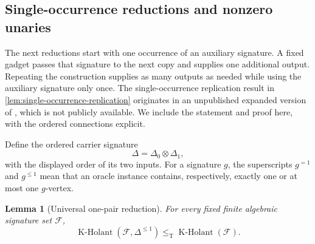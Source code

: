 \documentclass[11pt,letterpaper,onecolumn]{article}
\theoremstyle{plain}
\newtheorem{lemma}[lemma]{Lemma}
\theoremstyle{definition}
\theoremstyle{remark}
\newcommand{\cF}{\mathcal F}
\newcommand{\KHolant}{\operatorname{K\text{-}Holant}}
\newcommand{\DeltaZero}{\Delta_0}
\newcommand{\DeltaOne}{\Delta_1}
\newcommand{\leT}{\leq_{\mathrm T}}
\begin{document}
\subsection{Single-occurrence reductions and nonzero unaries}
\label{subsec:single-occurrence-carriers}

The next reductions start with one occurrence of an auxiliary signature.
A fixed gadget passes that signature to the next copy and supplies one
additional output. Repeating the construction supplies as many outputs
as needed while using the auxiliary signature only once.
The single-occurrence replication result in
\cref{lem:single-occurrence-replication} originates in an unpublished
expanded version of \cite{MengWangXiaZheng2025}, which is not publicly
available. We include the statement and proof here, with the ordered
connections explicit.

Define the ordered carrier signature
\[
  \Delta=\DeltaZero\otimes\DeltaOne,
\]
with the displayed order of its two inputs.  For a signature \(g\), the
superscripts \(g^{=1}\) and \(g^{\leq1}\) mean that an oracle instance contains,
respectively, exactly one or at most one \(g\)-vertex.  

\begin{lemma}[Universal one-pair reduction]
\label{lem:universal-directed-pair}
For every fixed finite algebraic signature set \(\cF\),
\[
  \KHolant(\cF,\Delta^{\leq1})
  \leT
  \KHolant(\cF).
\]

\end{lemma}
\end{document}

